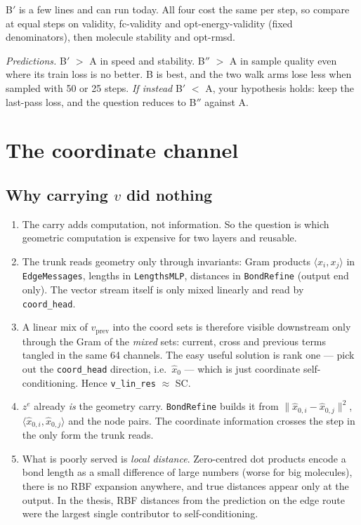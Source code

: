 \documentclass[11pt,a4paper]{article}
\newcommand{\ze}{z^{e}}
\newcommand{\xh}{\hat{x}_0}
\newcommand{\xhat}[1]{\hat{x}_{0,#1}}
\newcommand{\code}[1]{\texttt{#1}}
\begin{document}
B$'$ is a few lines and can run today. All four cost the same per step, so compare at
equal steps on validity, fc-validity and opt-energy-validity (fixed denominators), then
molecule stability and opt-rmsd.

\emph{Predictions.} B$'$ $>$ A in speed and stability. B$''$ $>$ A in sample quality
even where its train loss is no better. B is best, and the two walk arms lose less when
sampled with 50 or 25 steps. \emph{If instead} B$'$ $<$ A, your hypothesis holds:
keep the last-pass loss, and the question reduces to B$''$ against A.

\section{The coordinate channel}\label{sec:coords}

\subsection{Why carrying $v$ did nothing}

\begin{enumerate}
  \item The carry adds computation, not information. So the question is which
        geometric computation is expensive for two layers and reusable.
  \item The trunk reads geometry only through invariants: Gram products
        $\langle x_i,x_j\rangle$ in \code{EdgeMessages}, lengths in \code{LengthsMLP},
        distances in \code{BondRefine} (output end only). The vector stream itself is
        only mixed linearly and read by \code{coord\_head}.
  \item A linear mix of $v_{\text{prev}}$ into the coord sets is therefore visible
        downstream only through the Gram of the \emph{mixed} sets: current, cross and
        previous terms tangled in the same 64 channels. The easy useful solution is
        rank one --- pick out the \code{coord\_head} direction, i.e.\ $\xh$ --- which is
        just coordinate self-conditioning. Hence \code{v\_lin\_res} $\approx$ SC.
  \item $\ze$ already \emph{is} the geometry carry. \code{BondRefine} builds it from
        $\|\xhat{i}-\xhat{j}\|^2$, $\langle\xhat{i},\xhat{j}\rangle$ and the node
        pairs. The coordinate information crosses the step in the only form the trunk
        reads.
  \item What is poorly served is \emph{local distance}. Zero-centred dot products
        encode a bond length as a small difference of large numbers (worse for big
        molecules), there is no RBF expansion anywhere, and true distances appear only
        at the output. In the thesis, RBF distances from the prediction on the edge
        route were the largest single contributor to self-conditioning.
\end{enumerate}
\end{document}
